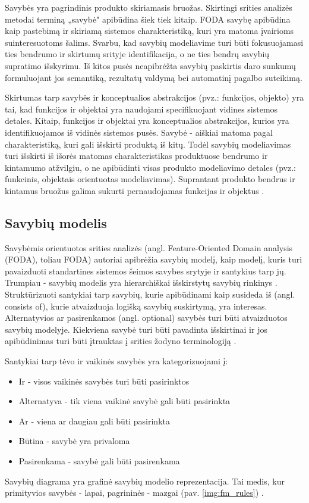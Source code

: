 \documentclass{VUMIFPSkursinis}
\begin{document}
Savybės yra pagrindinis produkto skiriamasis bruožas. Skirtingi srities analizės metodai terminą „savybė" apibūdina šiek tiek kitaip. FODA \cite{Kang1990} savybę apibūdina kaip pastebimą ir skiriamą sistemos charakteristiką, kuri yra matoma įvairioms suinteresuotoms šalims. Svarbu, kad savybių modeliavime turi būti fokusuojamasi ties bendrumo ir skirtumų srityje identifikacija, o ne ties bendrų savybių supratimo išskyrimu. Iš kitos pusės neapibrėžta savybių paskirtis daro sunkumų formuluojant jos semantiką, rezultatų valdymą bei automatinį pagalbo suteikimą.

Skirtumas tarp savybės ir konceptualios abstrakcijos (pvz.: funkcijos, objekto) yra tai, kad funkcijos ir objektai yra naudojami specifikuojant vidines sistemos detales. Kitaip, funkcijos ir objektai yra konceptualios abstrakcijos, kurios yra identifikuojamos iš vidinės sistemos pusės. Savybė - aiškiai matoma  pagal charakteristiką, kuri gali išskirti produktą iš kitų. Todėl savybių modeliavimas turi išskirti iš išorės matomas charakteristikas produktuose bendrumo ir kintamumo atžvilgiu, o ne apibūdinti visas produkto modeliavimo detales (pvz.: funkcinis, objektais orientuotas modeliavimas). Suprantant produkto bendrus ir kintamus bruožus galima sukurti pernaudojamas funkcijas ir objektus \cite{Lee2015}.

\subsection{Savybių modelis}

Savybėmis orientuotos srities analizės (angl. Feature-Oriented Domain analysis (FODA), toliau FODA) \cite{Kang1990} autoriai apibrėžia savybių modelį, kaip modelį, kuris turi pavaizduoti standartines sistemos šeimos savybes srytyje ir santykius tarp jų. Trumpiau - savybių modelis yra hierarchiškai išskirstytų savybių rinkinys \cite{Batory2005}. Struktūrizuoti santykiai tarp savybių, kurie apibūdinami kaip susideda iš (angl. consists of), kurie atvaizduoja logišką savybių suskirtymą, yra interesas. Alternatyvios ar pasirenkamos (angl. optional) savybės turi būti atvaizduotos savybių modelyje. Kiekviena savybė turi būti pavadinta išskirtinai ir jos apibūdinimas turi būti įtrauktas į srities žodyno terminologiją \cite{Kang1990}.

Santykiai tarp tėvo ir vaikinės savybės yra kategorizuojami į:
\begin{itemize}
\item Ir - visos vaikinės savybės turi būti pasirinktos
\item Alternatyva - tik viena vaikinė savybė gali būti pasirinkta 
\item Ar - viena ar daugiau gali būti pasirinkta
\item Būtina - savybė yra privaloma
\item Pasirenkama - savybė gali būti pasirenkama
\end{itemize}
Savybių diagrama yra grafinė savybių modelio reprezentacija. Tai medis, kur primityvios savybės - lapai, pagrininės - mazgai (pav. \ref{img:fm_rules}) \cite{Batory2005}. 
\end{document}
